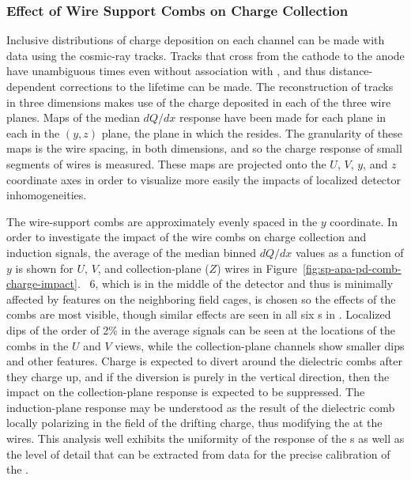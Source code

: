 


\subsubsection{Effect of Wire Support Combs on Charge Collection}
\label{sec:fdsp-apa-qa-protodune-ops-combs-charge}

Inclusive distributions of charge deposition on each channel can be made with  data using the cosmic-ray tracks.  Tracks that cross from the cathode to the anode have unambiguous times even without association with , and thus distance-dependent corrections to the lifetime can be made.  The reconstruction of tracks in three dimensions makes use of the charge deposited in each of the three wire planes.  Maps of the median $dQ/dx$ response have been made for each plane in each  in the $(y,z)$ plane, the plane in which the  resides.  The granularity of these maps is the wire spacing, in both dimensions, and so the charge response of small segments of wires is measured.  These maps are projected onto the $U$, $V$, $y$, and $z$ coordinate axes in order to visualize more easily the impacts of localized detector inhomogeneities.

The wire-support combs are approximately evenly spaced in the $y$ coordinate.  In order to investigate the impact of the wire combs on charge collection and induction signals, the average of the median binned $dQ/dx$ values as a function of $y$ is shown for $U$, $V$, and collection-plane ($Z$) wires in Figure~\ref{fig:sp-apa-pd-comb-charge-impact}.  ~6, which is in the middle of the detector and thus is minimally affected by features on the neighboring field cages, is chosen so the effects of the combs are most visible, though similar effects are seen in all six s in .  Localized dips of the order of 2\% in the average signals can be seen at the locations of the combs in the $U$ and $V$ views, while the collection-plane channels show smaller dips and other features.  Charge is expected to divert around the dielectric combs after they charge up, and if the diversion is purely in the vertical direction, then the impact on the collection-plane response is expected to be suppressed.  The induction-plane response may be understood as the result of the dielectric comb locally polarizing in the field of the drifting charge, thus modifying the \efield at the wires.  This analysis well exhibits the uniformity of the response of the  s as well as the level of detail that can be extracted from  data for the precise calibration of the .

